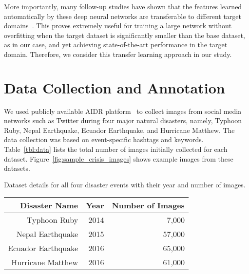 \documentclass{iscram}
\begin{document}
More importantly, many follow-up studies have shown that the features learned automatically by these deep neural networks are transferable to different target domains~\parencite{JDonahue:ICML14,Sermanet:ICLR14,Zeiler:ECCV14,RGirshick:CVPR14,MOquab:CVPR14}. This proves extremely useful for training a large network without overfitting when the target dataset is significantly smaller than the base dataset, as in our case, and yet achieving state-of-the-art performance in the target domain. Therefore, we consider this transfer learning approach in our study.

\section{Data Collection and Annotation}\label{sec:datasets}%
We used publicly available AIDR platform~\parencite{imran2014aidr} to collect images from social media networks such as Twitter during four major natural disasters, namely, Typhoon Ruby, Nepal Earthquake, Ecuador Earthquake, and Hurricane Matthew. The data collection was based on event-specific hashtags and keywords.
Table~\ref{tbl:data} lists the total number of images initially collected for each dataset. Figure~\ref{fig:sample_crisis_images} shows example images from these datasets. %
\caption{Dataset details for all four disaster events with their year and number of images.}
\centering
\begin{tabular}{rrr}
\toprule
 Disaster Name & Year & Number of Images\\
\midrule
Typhoon Ruby &2014 & 7,000 \\
Nepal Earthquake & 2015 & 57,000\\
Ecuador Earthquake &2016 & 65,000 \\
Hurricane Matthew &2016  & 61,000\\
\bottomrule
\end{tabular}
\end{document}
